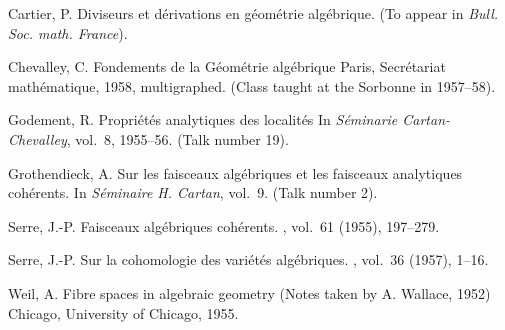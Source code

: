 \documentclass{article}
\theoremstyle{plain}
\theoremstyle{definition}
\begin{document}
\begin{thebibliography}{10}

  {\sc Cartier, P.}
  \newblock Diviseurs et d\'{e}rivations en g\'{e}om\'{e}trie alg\'{e}brique.
  \newblock (To appear in {\em Bull. Soc. math. France}).

  {\sc Chevalley, C.}
  \newblock Fondements de la G\'{e}om\'{e}trie alg\'{e}brique
  \newblock Paris, Secr\'{e}tariat math\'{e}matique, 1958, multigraphed.
  \newblock (Class taught at the Sorbonne in 1957--58).

  {\sc Godement, R.}
  \newblock Propri\'{e}t\'{e}s analytiques des localit\'{e}s
  \newblock In {\em S\'{e}minarie Cartan-Chevalley}, vol.~8, 1955--56.
  \newblock (Talk number 19).

  {\sc Grothendieck, A.}
  \newblock Sur les faisceaux alg\'{e}briques et les faisceaux analytiques
    coh\'{e}rents.
  \newblock In {\em S\'{e}minaire H. Cartan}, vol.~9.
  \newblock (Talk number 2).

  {\sc Serre, J.-P.}
  \newblock Faisceaux alg\'{e}briques coh\'{e}rents.
  , vol.~61 (1955), 197--279.

  {\sc Serre, J.-P.}
  \newblock Sur la cohomologie des vari\'{e}t\'{e}s alg\'{e}briques.
  , vol.~36 (1957), 1--16.

  {\sc Weil, A.}
  \newblock Fibre spaces in algebraic geometry
  \newblock (Notes taken by A. Wallace, 1952)
  \newblock Chicago, University of Chicago, 1955.

\end{thebibliography}
\end{document}
